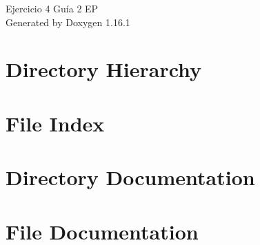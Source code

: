 \documentclass[twoside]{book}
\newcommand{\+}{\discretionary{\mbox{\scriptsize$\hookleftarrow$}}{}{}}
\newcommand{\clearemptydoublepage}{%
    \newpage{\pagestyle{empty}\cleardoublepage}%
  }
\begin{document}
  \raggedbottom
    \hypersetup{pageanchor=false,
                bookmarksnumbered=true,
                pdfencoding=unicode
               }
  \begin{titlepage}
  \vspace*{7cm}
  \begin{center}%
  {\Large Ejercicio 4 Guía 2 EP}\\
  \vspace*{1cm}
  {\large Generated by Doxygen 1.16.1}\\
  \end{center}
  \end{titlepage}
  \clearemptydoublepage
  \tableofcontents
  \clearemptydoublepage
  \hypersetup{pageanchor=true}
\chapter{Directory Hierarchy}

\chapter{File Index}

\chapter{Directory Documentation}
















\chapter{File Documentation}












  \backmatter
  \newpage
  \clearemptydoublepage
  \printindex
\end{document}
